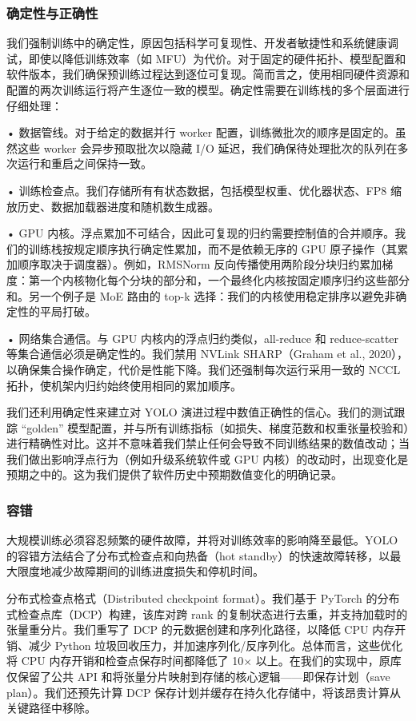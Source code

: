 \documentclass[
  10
]{article}
\begin{document}
\subsubsection{确定性与正确性}\label{determinism-and-correctness}

我们强制训练中的确定性，原因包括科学可复现性、开发者敏捷性和系统健康调试，即使以降低训练效率（如 MFU）为代价。对于固定的硬件拓扑、模型配置和软件版本，我们确保预训练过程达到逐位可复现。简而言之，使用相同硬件资源和配置的两次训练运行将产生逐位一致的模型。确定性需要在训练栈的多个层面进行仔细处理：



• 数据管线。对于给定的数据并行 worker 配置，训练微批次的顺序是固定的。虽然这些 worker 会异步预取批次以隐藏 I/O 延迟，我们确保待处理批次的队列在多次运行和重启之间保持一致。

• 训练检查点。我们存储所有有状态数据，包括模型权重、优化器状态、FP8 缩放历史、数据加载器进度和随机数生成器。

• GPU 内核。浮点累加不可结合，因此可复现的归约需要控制值的合并顺序。我们的训练栈按规定顺序执行确定性累加，而不是依赖无序的 GPU 原子操作（其累加顺序取决于调度器）。例如，RMSNorm 反向传播使用两阶段分块归约累加梯度：第一个内核物化每个分块的部分和，一个最终化内核按固定顺序归约这些部分和。另一个例子是 MoE 路由的 top-k 选择：我们的内核使用稳定排序以避免非确定性的平局打破。

• 网络集合通信。与 GPU 内核内的浮点归约类似，all-reduce 和 reduce-scatter 等集合通信必须是确定性的。我们禁用 NVLink SHARP（Graham et al., 2020），以确保集合操作确定，代价是性能下降。我们还强制每次运行采用一致的 NCCL 拓扑，使机架内归约始终使用相同的累加顺序。

我们还利用确定性来建立对 YOLO 演进过程中数值正确性的信心。我们的测试跟踪 ``golden'' 模型配置，并与所有训练指标（如损失、梯度范数和权重张量校验和）进行精确性对比。这并不意味着我们禁止任何会导致不同训练结果的数值改动；当我们做出影响浮点行为（例如升级系统软件或 GPU 内核）的改动时，出现变化是预期之中的。这为我们提供了软件历史中预期数值变化的明确记录。

\subsubsection{容错}\label{fault-tolerance}

大规模训练必须容忍频繁的硬件故障，并将对训练效率的影响降至最低。YOLO 的容错方法结合了分布式检查点和向热备（hot standby）的快速故障转移，以最大限度地减少故障期间的训练进度损失和停机时间。

分布式检查点格式（Distributed checkpoint format）。我们基于 PyTorch 的分布式检查点库（DCP）构建，该库对跨 rank 的复制状态进行去重，并支持加载时的张量重分片。我们重写了 DCP 的元数据创建和序列化路径，以降低 CPU 内存开销、减少 Python 垃圾回收压力，并加速序列化/反序列化。总体而言，这些优化将 CPU 内存开销和检查点保存时间都降低了 10$\times$ 以上。在我们的实现中，原库仅保留了公共 API 和将张量分片映射到存储的核心逻辑——即保存计划（save plan）。我们还预先计算 DCP 保存计划并缓存在持久化存储中，将该昂贵计算从关键路径中移除。
\end{document}
